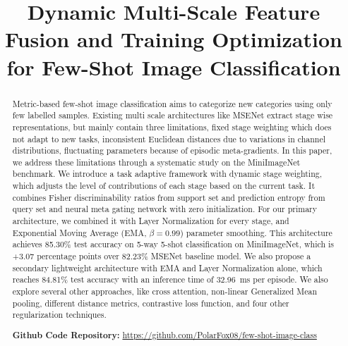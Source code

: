 \documentclass[conference]{IEEEtran}
\begin{document}
\title{Dynamic Multi-Scale Feature Fusion and Training Optimization for Few-Shot Image Classification}

\author{
}

\maketitle

\begin{abstract}
Metric-based few-shot image classification aims to categorize new categories using only few labelled samples. Existing multi scale architectures like MSENet extract stage wise representations, but mainly contain three limitations, fixed stage weighting which does not adapt to new tasks, inconsistent Euclidean distances due to variations in channel distributions, fluctuating parameters because of episodic meta-gradients.
In this paper, we address these limitations through a systematic study on the MiniImageNet benchmark. We introduce a task adaptive framework with dynamic stage weighting, which adjusts the level of contributions of each stage based on the current task. It combines Fisher discriminability ratios from support set and prediction entropy from query set and neural meta gating network with zero initialization. For our primary architecture, we combined it with Layer Normalization for every stage, and Exponential Moving Average (EMA, $\beta=0.99$) parameter smoothing. This architecture achieves 85.30\% test accuracy on 5-way 5-shot classification on MiniImageNet, which is +3.07 percentage points over 82.23\% MSENet baseline model. We also propose a secondary lightweight architecture with EMA and Layer Normalization alone, which reaches 84.81\% test accuracy with an inference time of 32.96~ms per episode. We also explore several other approaches, like cross attention, non-linear Generalized Mean pooling, different distance metrics, contrastive loss function, and four other regularization techniques. 
\vspace{0.3em}

\noindent\textbf{Github Code Repository:} \url{https://github.com/PolarFox08/few-shot-image-class}
\end{abstract}
\end{document}
